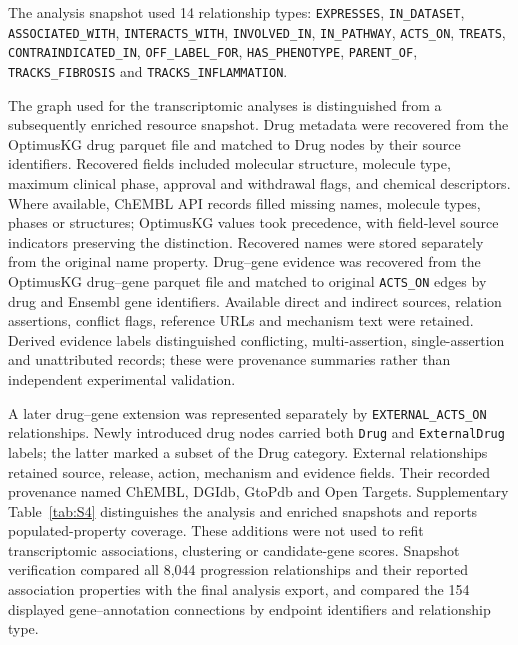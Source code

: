 \documentclass[11pt,a4paper]{article}
\begin{document}
\begingroup\raggedright
The analysis snapshot used 14 relationship types: \texttt{EXPRESSES}, \texttt{IN\_DATASET}, \texttt{ASSOCIATED\_WITH}, \texttt{INTERACTS\_WITH}, \texttt{INVOLVED\_IN}, \texttt{IN\_PATHWAY}, \texttt{ACTS\_ON}, \texttt{TREATS}, \texttt{CONTRAINDICATED\_IN}, \texttt{OFF\_LABEL\_FOR}, \texttt{HAS\_PHENOTYPE}, \texttt{PARENT\_OF}, \texttt{TRACKS\_FIBROSIS} and \texttt{TRACKS\_INFLAMMATION}.\par
\endgroup

The graph used for the transcriptomic analyses is distinguished from a subsequently enriched resource snapshot. Drug metadata were recovered from the OptimusKG drug parquet file and matched to Drug nodes by their source identifiers. Recovered fields included molecular structure, molecule type, maximum clinical phase, approval and withdrawal flags, and chemical descriptors. Where available, ChEMBL API records filled missing names, molecule types, phases or structures; OptimusKG values took precedence, with field-level source indicators preserving the distinction. Recovered names were stored separately from the original name property. Drug--gene evidence was recovered from the OptimusKG drug--gene parquet file and matched to original \texttt{ACTS\_ON} edges by drug and Ensembl gene identifiers. Available direct and indirect sources, relation assertions, conflict flags, reference URLs and mechanism text were retained. Derived evidence labels distinguished conflicting, multi-assertion, single-assertion and unattributed records; these were provenance summaries rather than independent experimental validation.

A later drug--gene extension was represented separately by \texttt{EXTERNAL\_ACTS\_ON} relationships. Newly introduced drug nodes carried both \texttt{Drug} and \texttt{ExternalDrug} labels; the latter marked a subset of the Drug category. External relationships retained source, release, action, mechanism and evidence fields. Their recorded provenance named ChEMBL, DGIdb, GtoPdb and Open Targets. Supplementary Table~\ref{tab:S4} distinguishes the analysis and enriched snapshots and reports populated-property coverage. These additions were not used to refit transcriptomic associations, clustering or candidate-gene scores. Snapshot verification compared all 8,044 progression relationships and their reported association properties with the final analysis export, and compared the 154 displayed gene--annotation connections by endpoint identifiers and relationship type.
\end{document}
